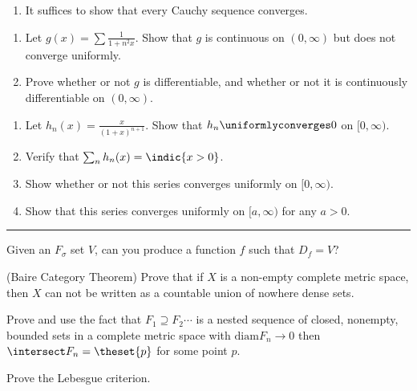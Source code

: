 \begin{solution}
\begin{enumerate}
  \item It suffices to show that every Cauchy sequence converges.
\end{enumerate}
\end{solution}


\begin{problem}
\begin{enumerate}
  \item Let $g(x) = \sum \frac 1 {1 + n^2 x}$. Show that $g$ is continuous on $(0, \infty)$ but does not converge uniformly.
  \item Prove whether or not $g$ is differentiable, and whether or not it is continuously differentiable on $(0, \infty)$.
\end{enumerate}
\end{problem}


\begin{problem}
\begin{enumerate}
  \item Let $h_n(x) = \frac x {(1+x)^{n+1}}$. Show that $h_n \uniformlyconverges 0$ on $[0, \infty)$.
  \item Verify that $\sum_n h_n(x) = \indic{x > 0}$.
  \item Show whether or not this series converges uniformly on $[0, \infty)$.
  \item Show that this series converges uniformly on $[a, \infty)$ for any $a>0$.
\end{enumerate}
\end{problem}

\vspace{2em}\hrule

\begin{problem}
  Given an $F_\sigma$ set $V$, can you produce a function $f$ such that $D_f = V$?
\end{problem}

\begin{problem}
  (Baire Category Theorem) Prove that if $X$ is a non-empty complete metric space, then $X$ can not be written as a countable union of nowhere dense sets.

  Prove and use the fact that $F_1 \supseteq F_2 \cdots$ is a nested sequence of closed, nonempty, bounded sets in a complete metric space with $\mathrm{diam} F_n  \to 0$ then $\intersect F_n = \theset{p}$ for some point $p$.
\end{problem}

\begin{problem}
  Prove the Lebesgue criterion.
\end{problem}

